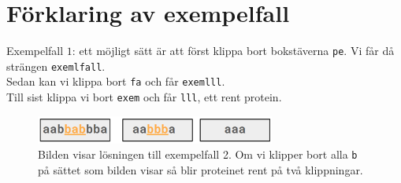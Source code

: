 \section*{Förklaring av exempelfall}
Exempelfall $1$: ett möjligt sätt är att först klippa bort bokstäverna \texttt{pe}.
Vi får då strängen \texttt{exemlfall}. \\
Sedan kan vi klippa bort \texttt{fa} och får \texttt{exemlll}. \\
Till sist klippa vi bort \texttt{exem} och får \texttt{lll}, ett rent protein. 



\begin{figure}[h]
  \centering
  \includegraphics[width=0.7\textwidth]{sample2.PNG}
    \\Bilden visar lösningen till exempelfall 2. Om vi klipper bort alla \texttt{b}
    på sättet som bilden visar så blir proteinet rent på två klippningar.
  
\end{figure}
